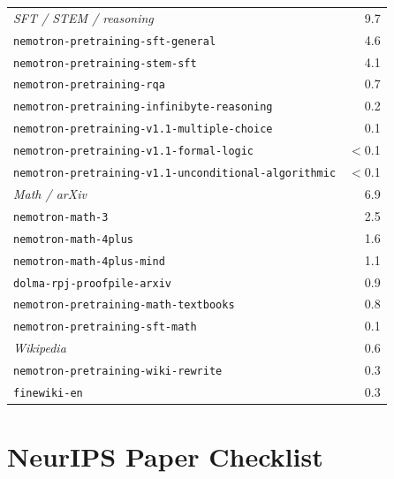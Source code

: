 \documentclass{article}
\begin{document}
\begin{table}[h]
\begin{tabular}{lr}
\midrule
\emph{SFT / STEM / reasoning} & 9.7 \\
\quad \texttt{nemotron-pretraining-sft-general} & 4.6 \\
\quad \texttt{nemotron-pretraining-stem-sft} & 4.1 \\
\quad \texttt{nemotron-pretraining-rqa} & 0.7 \\
\quad \texttt{nemotron-pretraining-infinibyte-reasoning} & 0.2 \\
\quad \texttt{nemotron-pretraining-v1.1-multiple-choice} & 0.1 \\
\quad \texttt{nemotron-pretraining-v1.1-formal-logic} & $<$0.1 \\
\quad \texttt{nemotron-pretraining-v1.1-unconditional-algorithmic} & $<$0.1 \\
\midrule
\emph{Math / arXiv} & 6.9 \\
\quad \texttt{nemotron-math-3} & 2.5 \\
\quad \texttt{nemotron-math-4plus} & 1.6 \\
\quad \texttt{nemotron-math-4plus-mind} & 1.1 \\
\quad \texttt{dolma-rpj-proofpile-arxiv} & 0.9 \\
\quad \texttt{nemotron-pretraining-math-textbooks} & 0.8 \\
\quad \texttt{nemotron-pretraining-sft-math} & 0.1 \\
\midrule
\emph{Wikipedia} & 0.6 \\
\quad \texttt{nemotron-pretraining-wiki-rewrite} & 0.3 \\
\quad \texttt{finewiki-en} & 0.3 \\
\bottomrule
\end{tabular}
\end{table}

\iffalse
\section*{NeurIPS Paper Checklist}
\end{document}
